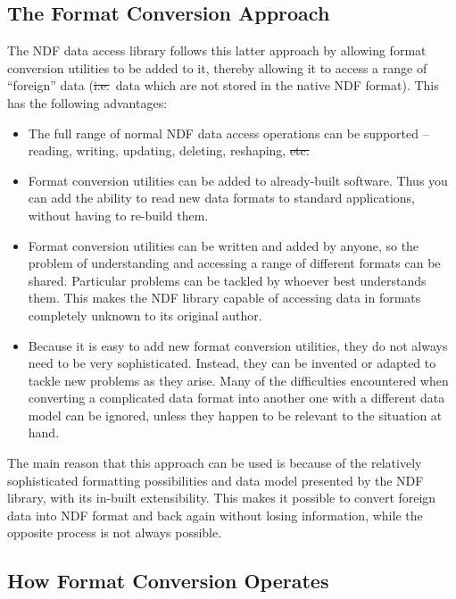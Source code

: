 \subsection{The Format Conversion Approach}

The NDF data access library follows this latter approach by allowing
format conversion utilities to be added to it, thereby allowing it to
access a range of ``foreign'' data (\st{i.e.}\ data which are not
stored in the native NDF format). This has the following advantages:

\begin{itemize}
\item The full range of normal NDF data access operations can be
supported -- reading, writing, updating, deleting, reshaping, \st{etc.}

\item Format conversion utilities can be added to already-built
software. Thus you can add the ability to read new data formats to
standard applications, without having to re-build them.

\item Format conversion utilities can be written and added by anyone,
so the problem of understanding and accessing a range of different
formats can be shared. Particular problems can be tackled by whoever
best understands them. This makes the NDF library capable of accessing
data in formats completely unknown to its original author.

\item Because it is easy to add new format conversion utilities, they
do not always need to be very sophisticated. Instead, they can be
invented or adapted to tackle new problems as they arise.  Many of the
difficulties encountered when converting a complicated data format
into another one with a different data model can be ignored, unless
they happen to be relevant to the situation at hand.

\end{itemize}

The main reason that this approach can be used is because of the
relatively sophisticated formatting possibilities and data model
presented by the NDF library, with its in-built extensibility.  This
makes it possible to convert foreign data into NDF format and back
again without losing information, while the opposite process is not
always possible.

\subsection{How Format Conversion Operates}

